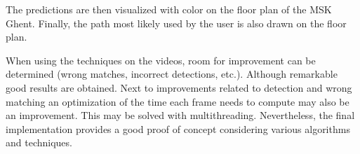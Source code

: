 The predictions are then visualized with color on the floor plan of the MSK Ghent. Finally, the path most likely used by the user is also drawn on the floor plan.

When using the techniques on the videos, room for improvement can be determined (wrong matches, incorrect detections, etc.). Although remarkable good results are obtained. Next to improvements related to detection and wrong matching an optimization of the time each frame needs to compute may also be an improvement. This may be solved with multithreading. Nevertheless, the final implementation provides a good proof of concept considering various algorithms and techniques.



